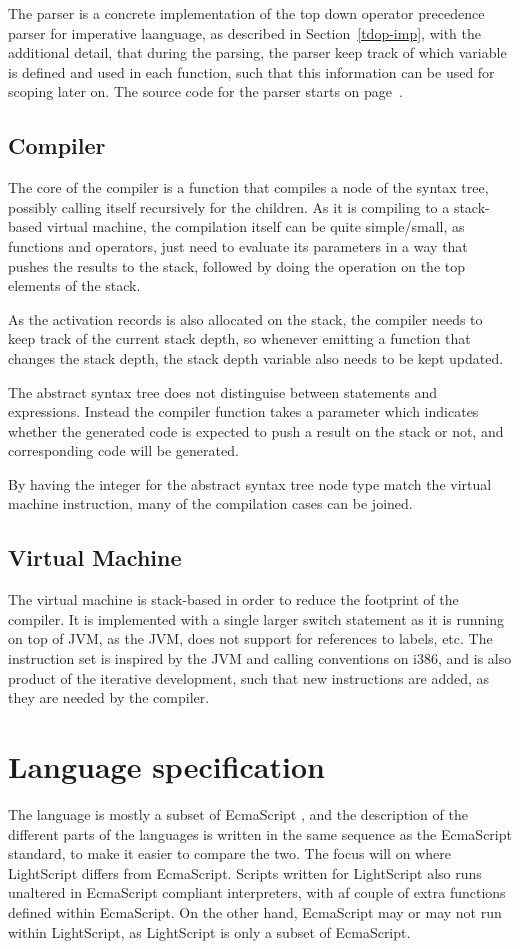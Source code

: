 \documentclass[11pt]{report}
\begin{document}
The parser is a concrete implementation of the top down operator precedence parser for imperative laanguage, as described in Section~\ref{tdop-imp}, with the additional detail, that during the parsing, the parser keep track of which variable is defined and used in each function, such that this information can be used for scoping later on. 
The source code for the parser starts on page~\pageref{lightscript-parser}.

\subsection{Compiler}

The core of the compiler is a function that compiles a node of the syntax tree, possibly calling itself recursively for the children.
As it is compiling to a stack-based virtual machine, the compilation itself can be quite simple/small, as functions and operators, just need to evaluate its parameters in a way that pushes the results to the stack, followed by doing the operation on the top elements of the stack.

As the activation records is also allocated on the stack, the compiler needs to keep track of the current stack depth, so whenever emitting a function that changes the stack depth, the stack depth variable also needs to be kept updated.

The abstract syntax tree does not distinguise between statements and expressions. Instead the compiler function takes a parameter which indicates whether the generated code is expected to push a result on the stack or not, and corresponding code will be generated. 

By having the integer for the abstract syntax tree node type match the virtual machine instruction, many of the compilation cases can be joined.


\subsection{Virtual Machine}
The virtual machine is stack-based in order to reduce the footprint of the compiler.
It is implemented with a single larger switch statement as it is running on top of JVM, as the JVM, does not support for references to labels, etc.
The instruction set is inspired by the JVM and calling conventions on i386, and is also product of the iterative development, such that new instructions are added, as they are needed by the compiler.


\section{Language specification}
The language is mostly a subset of EcmaScript \cite{ecma-262}, and the description of the different parts of the languages is written in the same sequence as the EcmaScript standard, to make it easier to compare the two. The focus will on where LightScript differs from EcmaScript.
Scripts written for LightScript also runs unaltered in EcmaScript compliant interpreters, with af couple of extra functions defined within EcmaScript. On the other hand, EcmaScript may or may not run within LightScript, as LightScript is only a subset of EcmaScript.
\end{document}
